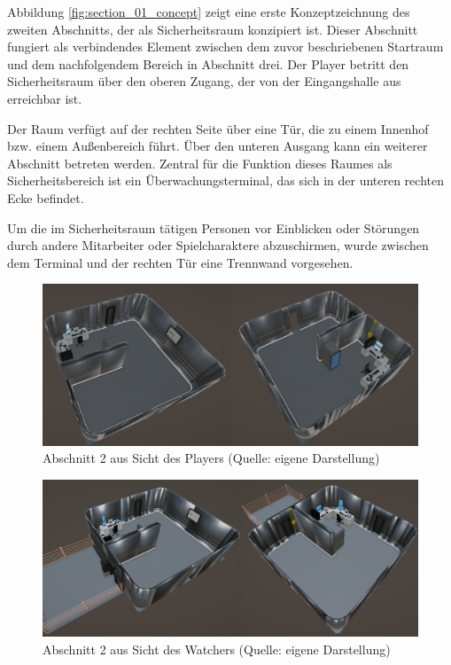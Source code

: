 Abbildung \ref{fig:section_01_concept} zeigt eine erste Konzeptzeichnung des zweiten Abschnitts, der als Sicherheitsraum konzipiert ist. Dieser Abschnitt fungiert als verbindendes Element zwischen dem zuvor beschriebenen Startraum und dem nachfolgendem Bereich in Abschnitt drei. Der Player betritt den Sicherheitsraum über den oberen Zugang, der von der Eingangshalle aus erreichbar ist.

Der Raum verfügt auf der rechten Seite über eine Tür, die zu einem Innenhof bzw. einem Außenbereich führt. Über den unteren Ausgang kann ein weiterer Abschnitt betreten werden. Zentral für die Funktion dieses Raumes als Sicherheitsbereich ist ein Überwachungsterminal, das sich in der unteren rechten Ecke befindet.

Um die im Sicherheitsraum tätigen Personen vor Einblicken oder Störungen durch andere Mitarbeiter oder Spielcharaktere abzuschirmen, wurde zwischen dem Terminal und der rechten Tür eine Trennwand vorgesehen.

\begin{figure}[ht]
\centering
\includegraphics[width=1\linewidth]{content/pictures/Abschnitt_01 - Player.png}
\caption{Abschnitt 2 aus Sicht des Players (Quelle: eigene Darstellung)}
\label{fig:section_01_player}
\end{figure}

\begin{figure}[ht]
\centering
\includegraphics[width=1\linewidth]{content/pictures/Abschnitt_01 - Watcher.png}
\caption{Abschnitt 2 aus Sicht des Watchers (Quelle: eigene Darstellung)}
\label{fig:section_01_watcher}
\end{figure}

